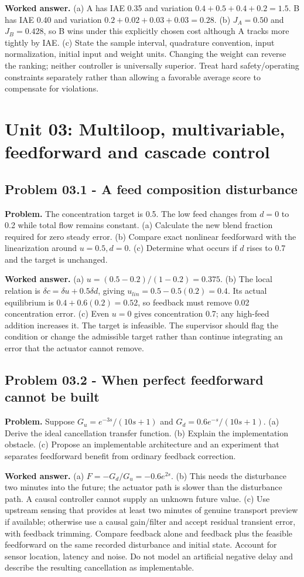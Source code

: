 \documentclass[11pt,a4paper]{article}
\begin{document}
\textbf{Worked answer.} (a) A has IAE 0.35 and variation $0.4+0.5+0.4+0.2=1.5$. B has IAE 0.40 and variation $0.2+0.02+0.03+0.03=0.28$. (b) $J_A=0.50$ and $J_B=0.428$, so B wins under this explicitly chosen cost although A tracks more tightly by IAE. (c) State the sample interval, quadrature convention, input normalization, initial input and weight units. Changing the weight can reverse the ranking; neither controller is universally superior. Treat hard safety/operating constraints separately rather than allowing a favorable average score to compensate for violations.


\clearpage\section{Unit 03: Multiloop, multivariable, feedforward and cascade control}
\subsection{Problem 03.1 - A feed composition disturbance}
\textbf{Problem.} The concentration target is 0.5. The low feed changes from $d=0$ to 0.2 while total flow remains constant. (a) Calculate the new blend fraction required for zero steady error. (b) Compare exact nonlinear feedforward with the linearization around $u=0.5,d=0$. (c) Determine what occurs if $d$ rises to 0.7 and the target is unchanged.


\textbf{Worked answer.} (a) $u=(0.5-0.2)/(1-0.2)=0.375$. (b) The local relation is $\delta c=\delta u+0.5\delta d$, giving $u_{lin}=0.5-0.5(0.2)=0.4$. Its actual equilibrium is $0.4+0.6(0.2)=0.52$, so feedback must remove 0.02 concentration error. (c) Even $u=0$ gives concentration 0.7; any high-feed addition increases it. The target is infeasible. The supervisor should flag the condition or change the admissible target rather than continue integrating an error that the actuator cannot remove.

\subsection{Problem 03.2 - When perfect feedforward cannot be built}
\textbf{Problem.} Suppose $G_u=e^{-3s}/(10s+1)$ and $G_d=0.6e^{-s}/(10s+1)$. (a) Derive the ideal cancellation transfer function. (b) Explain the implementation obstacle. (c) Propose an implementable architecture and an experiment that separates feedforward benefit from ordinary feedback correction.


\textbf{Worked answer.} (a) $F=-G_d/G_u=-0.6e^{2s}$. (b) This needs the disturbance two minutes into the future; the actuator path is slower than the disturbance path. A causal controller cannot supply an unknown future value. (c) Use upstream sensing that provides at least two minutes of genuine transport preview if available; otherwise use a causal gain/filter and accept residual transient error, with feedback trimming. Compare feedback alone and feedback plus the feasible feedforward on the same recorded disturbance and initial state. Account for sensor location, latency and noise. Do not model an artificial negative delay and describe the resulting cancellation as implementable.
\end{document}
